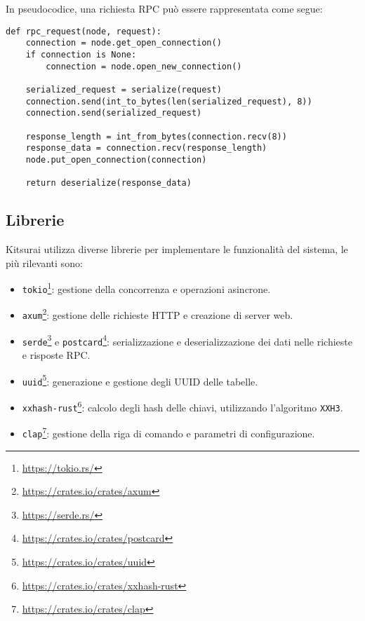 In pseudocodice, una richiesta RPC può essere rappresentata come segue:
\begin{verbatim}
def rpc_request(node, request):
    connection = node.get_open_connection()
    if connection is None:
        connection = node.open_new_connection()

    serialized_request = serialize(request)
    connection.send(int_to_bytes(len(serialized_request), 8))
    connection.send(serialized_request)

    response_length = int_from_bytes(connection.recv(8))
    response_data = connection.recv(response_length)
    node.put_open_connection(connection)

    return deserialize(response_data)
\end{verbatim}

\subsection{Librerie}
\label{subsec:librerie}

Kitsurai utilizza diverse librerie per implementare le funzionalità del sistema, le più rilevanti sono:
\begin{itemize}
    \item \texttt{tokio}\footnote{\url{https://tokio.rs/}}: gestione della concorrenza e operazioni asincrone.
    \item \texttt{axum}\footnote{\url{https://crates.io/crates/axum}}: gestione delle richieste HTTP e creazione di server web.
    \item \texttt{serde}\footnote{\url{https://serde.rs/}} e \texttt{postcard}\footnote{\url{https://crates.io/crates/postcard}}: serializzazione e deserializzazione dei dati nelle richieste e risposte RPC.
    \item \texttt{uuid}\footnote{\url{https://crates.io/crates/uuid}}: generazione e gestione degli UUID delle tabelle.
    \item \texttt{xxhash-rust}\footnote{\url{https://crates.io/crates/xxhash-rust}}: calcolo degli hash delle chiavi, utilizzando l'algoritmo \texttt{XXH3}.
    \item \texttt{clap}\footnote{\url{https://crates.io/crates/clap}}: gestione della riga di comando e parametri di configurazione.
\end{itemize}
